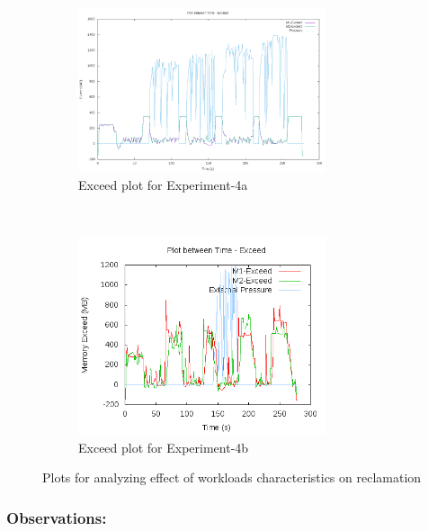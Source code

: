 	\begin{figure}[t!]
	  \centering
	  \begin{subfigure}[t]{0.48\textwidth}
	    \centering
	    \includegraphics[width=0.8\textwidth]{images/experimentation/workload/1/Exceed.png}
	    \caption{Exceed plot for Experiment-4a}
	    \label{img_workload_1_exceed}
	  \end{subfigure}
	  ~ 
	  \begin{subfigure}[t]{0.48\textwidth}
	    \centering
	    \includegraphics[width=0.8\textwidth]{images/experimentation/workload/2/Exceed.png}
	    \caption{Exceed plot for Experiment-4b}
	    \label{img_workload_2_exceed}
	  \end{subfigure}
	  \caption{Plots for analyzing effect of workloads characteristics on reclamation}
	\end{figure}		
	  
	\subsubsection{Observations:}
	
